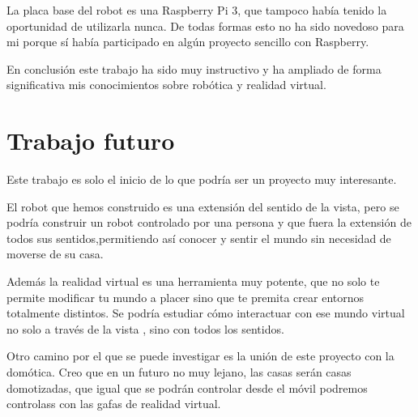\documentclass[twoside, 11pt]{epstfg}
\begin{document}
La placa base del robot es una Raspberry Pi 3, que tampoco había tenido la oportunidad de utilizarla nunca. De todas formas esto no ha sido novedoso para mi porque sí había participado en algún proyecto sencillo con Raspberry.

En conclusión este trabajo ha sido muy instructivo y ha ampliado de forma significativa mis conocimientos sobre robótica y realidad virtual.



\section{Trabajo futuro}
Este trabajo es solo el inicio de lo que podría ser un proyecto muy interesante.

El robot que hemos construido es una extensión del sentido de la vista, pero se podría construir un robot controlado por una persona y que fuera la extensión de todos sus sentidos,permitiendo así conocer y sentir el mundo sin necesidad de moverse de su casa.

Además la realidad virtual es una herramienta muy potente, que no solo te permite modificar tu mundo a placer sino que te premita crear entornos totalmente distintos. Se podría estudiar cómo interactuar con ese mundo virtual no solo a través de la vista , sino con todos los sentidos.

Otro camino por el que se puede investigar es la unión de este proyecto con la domótica.
Creo que en un futuro no muy lejano, las casas serán casas domotizadas, que igual que se podrán controlar desde el móvil podremos controlass con las gafas de realidad virtual.

\backmatter
\appendix

\cleardoublepage

\nocite{*}
{}

\cleardoublepage
\printindex
\end{document}

